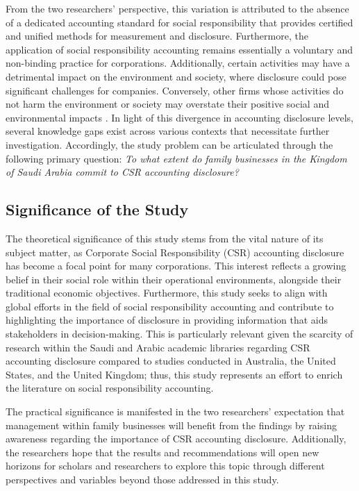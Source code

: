 \documentclass[10pt]{NSP1}
\begin{document}
	From the two researchers' perspective, this variation is attributed to the absence of a dedicated accounting standard for social responsibility that provides certified and unified methods for measurement and disclosure. Furthermore, the application of social responsibility accounting remains essentially a voluntary and non-binding practice for corporations. Additionally, certain activities may have a detrimental impact on the environment and society, where disclosure could pose significant challenges for companies. Conversely, other firms whose activities do not harm the environment or society may overstate their positive social and environmental impacts \cite{Bayoud2012}. In light of this divergence in accounting disclosure levels, several knowledge gaps exist across various contexts that necessitate further investigation. Accordingly, the study problem can be articulated through the following primary question: \emph{To what extent do family businesses in the Kingdom of Saudi Arabia commit to CSR accounting disclosure?}
	
	\subsection{Significance of the Study}
	
	The theoretical significance of this study stems from the vital nature of its subject matter, as Corporate Social Responsibility (CSR) accounting disclosure has become a focal point for many corporations. This interest reflects a growing belief in their social role within their operational environments, alongside their traditional economic objectives. Furthermore, this study seeks to align with global efforts in the field of social responsibility accounting and contribute to highlighting the importance of disclosure in providing information that aids stakeholders in decision-making. This is particularly relevant given the scarcity of research within the Saudi and Arabic academic libraries regarding CSR accounting disclosure compared to studies conducted in Australia, the United States, and the United Kingdom; thus, this study represents an effort to enrich the literature on social responsibility accounting.
	
	The practical significance is manifested in the two researchers' expectation that management within family businesses will benefit from the findings by raising awareness regarding the importance of CSR accounting disclosure. Additionally, the researchers hope that the results and recommendations will open new horizons for scholars and researchers to explore this topic through different perspectives and variables beyond those addressed in this study.
	
\end{document}
